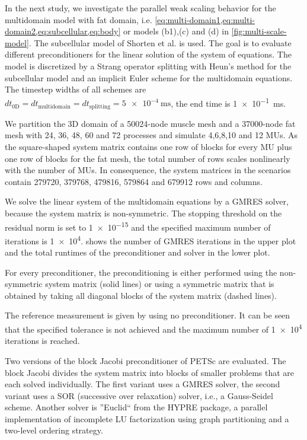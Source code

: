 In the next study, we investigate the parallel weak scaling behavior for the multidomain model with fat domain, i.e. \cref{eq:multi-domain1,eq:multi-domain2,eq:subcellular,eq:body} or models (b1),(c) and (d) in \cref{fig:multi-scale-model}. The subcellular model of Shorten et al. \cite{Shorten2007} is used. The goal is to evaluate different preconditioners for the linear solution of the system of equations. The model is discretized by a Strang operator splitting with Heun's method for the subcellular model and an implicit Euler scheme for the multidomain equations. The timestep widths of all schemes are $dt_\text{0D}=dt_\text{multidomain}=dt_\text{splitting}=\SI{5e-4}{\milli\second}$, the end time is \SI{1e-1}{\milli\second}.

We partition the 3D domain of a \num{50024}-node muscle mesh and a \num{37000}-node fat mesh with 24, 36, 48, 60 and 72 processes and simulate 4,6,8,10 and 12 MUs.
As the square-shaped system matrix contains one row of blocks for every MU plus one row of blocks for the fat mesh, the total number of rows scales nonlinearly with the number of MUs. In consequence, the system matrices in the scenarios contain \num{279720}, \num{379768}, \num{479816}, \num{579864} and \num{679912} rows and columns.


We solve the linear system of the multidomain equations by a GMRES solver, because the system matrix is non-symmetric.
 The stopping threshold on the residual norm is set to \num{1e-15} and the specified maximum number of iterations is \num{1e4}. 
  shows the number of GMRES iterations in the upper plot and the total runtimes of the preconditioner and solver in the lower plot.

For every preconditioner, the preconditioning is either performed using the non-symmetric system matrix (solid lines) or using a symmetric matrix that is obtained by taking all diagonal blocks of the system matrix (dashed lines).

The reference measurement is given by using no preconditioner. 
It can be seen that the specified tolerance is not achieved and the maximum number of \num{1e4} iterations is reached.

Two versions of the block Jacobi preconditioner of PETSc are evaluated.
The block Jacobi divides the system matrix into blocks of smaller problems that are each solved individually. 
The first variant uses a GMRES solver, the second variant uses a SOR (successive over relaxation) solver, i.e., a Gauss-Seidel scheme. 
Another solver is ''Euclid`` \cite{euclid} from the HYPRE package, a parallel implementation of incomplete LU factorization using graph partitioning and a two-level ordering strategy.


